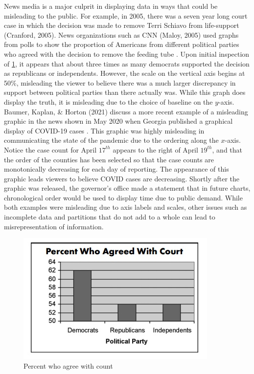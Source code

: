 \documentclass[print]{nuthesis}
\begin{document}
News media is a major culprit in displaying data in ways that could be misleading to the public. For example, in 2005, there was a seven year long court case in which the decision was made to remove Terri Schiavo from life-support (Cranford, 2005).
News organizations such as CNN (Maloy, 2005) used graphs from polls to show the proportion of Americans from different political parties who agreed with the decision to remove the feeding tube .
Upon initial inspection of \cref{fig:percent-who-agree-with-count}, it appears that about three times as many democrats supported the decision as republicans or independents.
However, the scale on the vertical axis begins at 50\%, misleading the viewer to believe there was a much larger discrepancy in support between political parties than there actually was.
While this graph does display the truth, it is misleading due to the choice of baseline on the \(y\)-axis.
Baumer, Kaplan, \& Horton (2021) discuss a more recent example of a misleading graphic in the news shown in May 2020 when Georgia published a graphical display of COVID-19 cases .
This graphic was highly misleading in communicating the state of the pandemic due to the ordering along the \(x\)-axis.
Notice the case count for April \(17^{th}\) appears to the right of April \(19^{th}\), and that the order of the counties has been selected so that the case counts are monotonically decreasing for each day of reporting.
The appearance of this graphic leads viewers to believe COVID cases are decreasing.
Shortly after the graphic was released, the governor's office made a statement that in future charts, chronological order would be used to display time due to public demand. While both examples were misleading due to axis labels and scales, other issues such as incomplete data and partitions that do not add to a whole can lead to misrepresentation of information.

\begin{figure}[tbp]

{\centering \includegraphics[width=0.85\linewidth,]{images/percent-who-agree-with-count} 

}

\caption{Percent who agree with count}\label{fig:percent-who-agree-with-count}
\end{figure}
\end{document}

